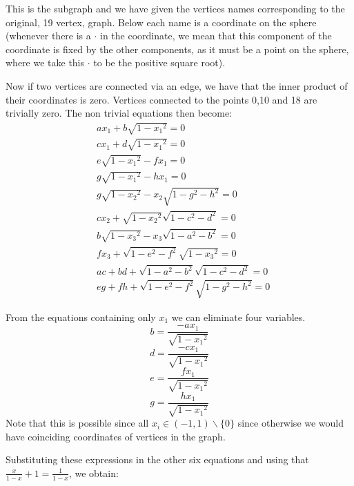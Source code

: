 \documentclass{report}
\begin{document}
This is the subgraph and we have given the vertices names corresponding
to the original, 19 vertex, graph. Below each name is a coordinate
on the sphere (whenever there is a $\cdot$ in the coordinate, we
mean that this component of the coordinate is fixed by the other
components, as it must be a point on the sphere, where we take
this $\cdot$ to be the positive square root).

Now if two vertices are connected via an edge, we have that the
inner product of their coordinates is zero. Vertices connected to
the points 0,10 and 18 are trivially zero. The non trivial equations
then become:
\begin{align}
&ax_1 + b\sqrt{1-{x_1}^2}=0\\
&cx_1 + d\sqrt{1-{x_1}^2}=0\\
&e\sqrt{1-{x_1}^2} - fx_1=0\\
&g\sqrt{1-{x_1}^2} - hx_1=0\\
&g\sqrt{1-{x_2}^2} - x_2 \sqrt{1-g^2-h^2}=0\\
&cx_2 + \sqrt{1-{x_2}^2}\sqrt{1-c^2-d^2}=0\\
&b\sqrt{1-{x_3}^2} - x_3 \sqrt{1-a^2-b^2}=0\\
&fx_3 + \sqrt{1-e^2-f^2}\sqrt{1-{x_3}^2}=0\\
&ac + bd + \sqrt{1-a^2-b^2}\sqrt{1-c^2 - d^2} = 0\\
&eg + fh + \sqrt{1-e^2-f^2}\sqrt{1-g^2 - h^2} = 0
\end{align}

From the equations containing only $x_1$ we can eliminate four variables.
\begin{equation}
b = \frac{-a x_1}{\sqrt{1-{x_1}^2}} \tag{1'}
\end{equation}
\begin{equation}
d = \frac{-c x_1}{\sqrt{1-{x_1}^2}} \tag{2'}
\end{equation}
\begin{equation}
e = \frac{f x_1}{\sqrt{1-{x_1}^2}} \tag{3'}
\end{equation}
\begin{equation}
g = \frac{h x_1}{\sqrt{1-{x_1}^2}} \tag{4'}
\end{equation}
Note that this is possible since all $x_i \in (-1,1)\backslash
\{0\}$ since otherwise we would have coinciding coordinates of
vertices in the graph.

Substituting these expressions in the other six equations and using
that~$\tfrac{x}{1-x} +1 = \tfrac{1}{1-x}$, we obtain:
\end{document}
